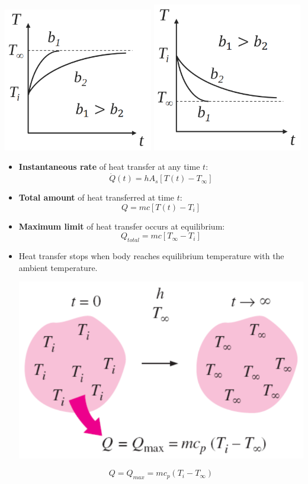 \documentclass[11pt]{article}
\begin{document}
\begin{center}
\includegraphics[width=0.49\textwidth]{./images/lumped-system-analysis-temperature-increasing-graph.png}
\includegraphics[width=0.49\textwidth]{./images/lumped-system-analysis-temperature-decreasing-graph.png}
\end{center}

\begin{itemize}
\item \textbf{Instantaneous rate} of heat transfer at any time \(t\):
\[\dot{Q}(t) = h A_s [T(t) - T_{\infty}]\]
\item \textbf{Total amount} of heat transferred at time \(t\):
\[Q = mc[T(t) - T_i]\]
\item \textbf{Maximum limit} of heat transfer occurs at equilibrium:
\[Q_{total} = mc[T_{\infty} - T_i]\]

 \newpage

\item Heat transfer stops when body reaches equilibrium temperature with the ambient temperature.
\begin{center}
\includegraphics[width=.9\linewidth]{./images/lumped-system-analysis-temperature-reach-ambient-diagram.png}
\end{center}
\[Q = Q_{max} = mc_{p} (T_i - T_{\infty})\]
\end{itemize}
\end{document}
